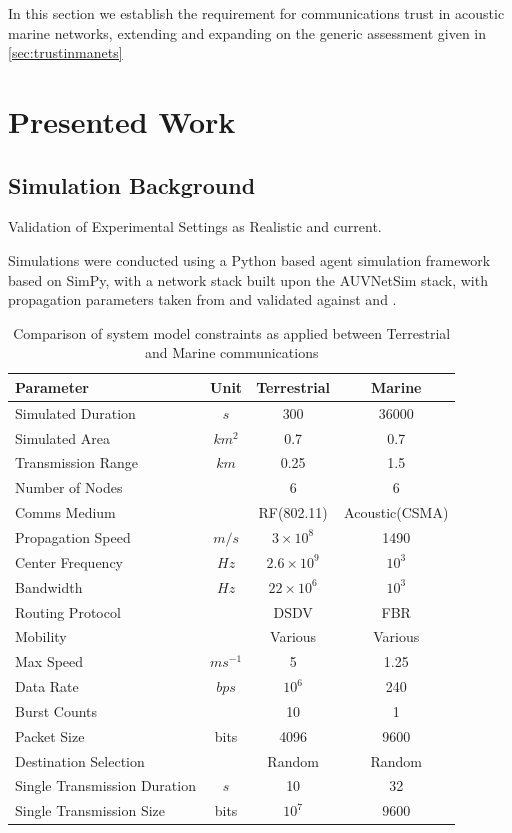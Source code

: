 \documentclass[runningheads,a4paper]{llncs}
\begin{document}
In this section we establish the requirement for communications trust in acoustic marine networks, extending and expanding on the generic assessment given in \ref{sec:trustinmanets}

\section{Presented Work}

\subsection{Simulation Background}

Validation of Experimental Settings as Realistic and current.

Simulations were conducted using a Python based agent simulation framework based on SimPy\cite{Mueller2003SimPy}, with a network stack built upon the AUVNetSim stack\cite{Miquel2008}, with propagation parameters taken from and validated against \cite{Stojanovic2007} and \cite{Stefanov2011}.

\begin{table}[h]
  \caption{Comparison of system model constraints as applied between Terrestrial and Marine communications} \label{tab:sysconstraints}
  \begin{center}
    \begin{tabular}{|l|c|c|c|}
      \hline
      Parameter & Unit & Terrestrial & Marine \\
      \hline
      Simulated Duration & $s$ & 300 & 36000\\
      Simulated Area & $km^2$ & 0.7 & 0.7 \\
      Transmission Range & $km$ & 0.25 & 1.5 \\
      Number of Nodes & & 6 & 6 \\
      Comms Medium & & RF(802.11) & Acoustic(CSMA)\\
      Propagation Speed& $m/s$ & $3\times10^8$ & 1490\\
      Center Frequency& $Hz$ & $2.6\times10^9$ & $10^3$ \\
      Bandwidth& $Hz$ & $22\times10^6$ & $10^3$\\
      Routing Protocol & & DSDV & FBR \\
      Mobility & & Various & Various \\
      Max Speed & $ms^{-1}$ & 5 & 1.25 \\
      Data Rate & $bps$ & $10^6$ & 240 \\
      Burst Counts & & 10 & 1 \\
      Packet Size & bits & 4096 & 9600 \\
      Destination Selection & & Random & Random\\
      Single Transmission Duration & $s$ & 10 & 32 \\
      Single Transmission Size & bits & $10^7$ & $9600$ \\
      \hline
    \end{tabular}
  \end{center}
\end{table}
\end{document}
